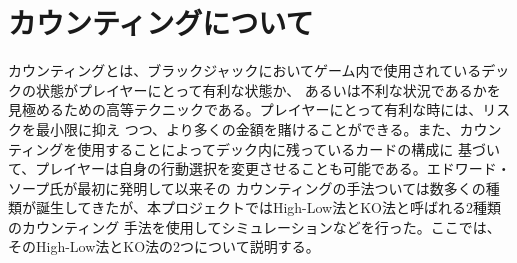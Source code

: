 \section{カウンティングについて}
カウンティングとは、ブラックジャックにおいてゲーム内で使用されているデックの状態がプレイヤーにとって有利な状態か、
あるいは不利な状況であるかを見極めるための高等テクニックである。プレイヤーにとって有利な時には、リスクを最小限に抑え
つつ、より多くの金額を賭けることができる。また、カウンティングを使用することによってデック内に残っているカードの構成に
基づいて、プレイヤーは自身の行動選択を変更させることも可能である。エドワード・ソープ氏が最初に発明して以来その
カウンティングの手法ついては数多くの種類が誕生してきたが、本プロジェクトではHigh-Low法とKO法と呼ばれる2種類のカウンティング
手法を使用してシミュレーションなどを行った。ここでは、そのHigh-Low法とKO法の2つについて説明する。

